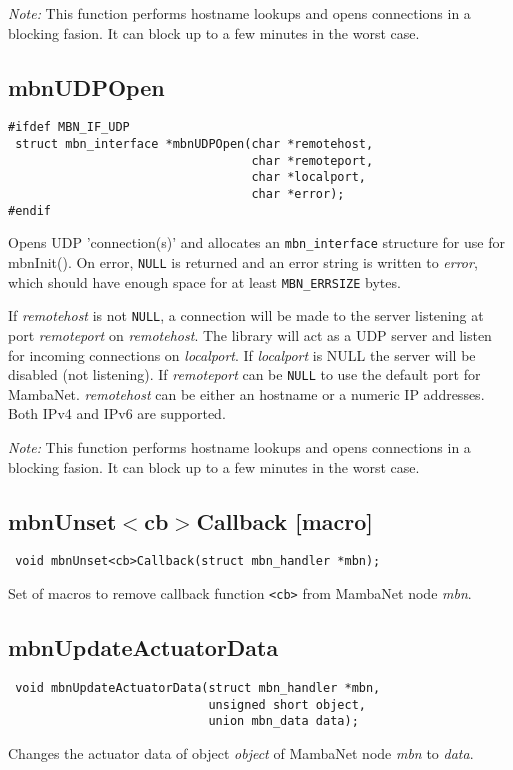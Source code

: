\emph{Note:} This function performs hostname lookups and opens connections in a blocking fasion. It can block up to a few minutes in the worst case.


\subsection{mbnUDPOpen}
\begin{verbatim}
#ifdef MBN_IF_UDP
 struct mbn_interface *mbnUDPOpen(char *remotehost,
                                  char *remoteport,
                                  char *localport,
                                  char *error);
#endif
\end{verbatim}
Opens UDP 'connection(s)' and allocates an \verb|mbn_interface| structure for use for mbnInit(). On error, \verb|NULL| is returned and an error string is written to \textit{error}, which should have enough space for at least \verb|MBN_ERRSIZE| bytes.

If \textit{remotehost} is not \verb|NULL|, a connection will be made to the server listening at port \textit{remoteport} on \textit{remotehost}.
The library will act as a UDP server and listen for incoming connections on \textit{localport}. If \textit{localport} is NULL the server will be disabled (not listening). If \textit{remoteport} can be \verb|NULL| to use the default port for MambaNet. \textit{remotehost} can be either an hostname or a numeric IP addresses. Both IPv4 and IPv6 are supported.

\emph{Note:} This function performs hostname lookups and opens connections in a blocking fasion. It can block up to a few minutes in the worst case.


\subsection{mbnUnset$<$cb$>$Callback \footnotesize{[macro]}}
\begin{verbatim}
 void mbnUnset<cb>Callback(struct mbn_handler *mbn);
\end{verbatim}
Set of macros to remove callback function \verb|<cb>| from MambaNet node \textit{mbn}. 


\subsection{mbnUpdateActuatorData}
\begin{verbatim}
 void mbnUpdateActuatorData(struct mbn_handler *mbn,
                            unsigned short object,
                            union mbn_data data);
\end{verbatim}
Changes the actuator data of object \textit{object} of MambaNet node \textit{mbn} to \textit{data}.


